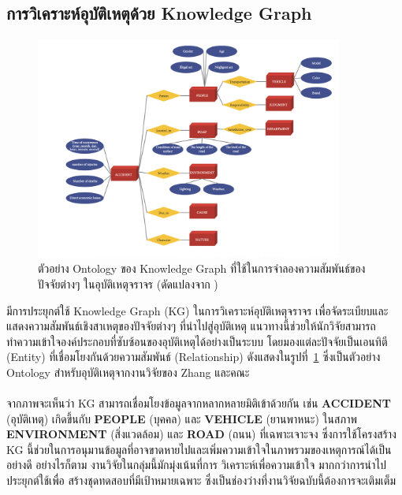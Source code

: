 \subsection{การวิเคราะห์อุบัติเหตุด้วย Knowledge Graph}{\label{sec:related_kg_analysis}}
\paragraph{}

\begin{figure}[htbp]
    \centering
    \includegraphics[width=0.9\textwidth]{images/kg-analysis-example}
    \caption{ตัวอย่าง Ontology ของ Knowledge Graph ที่ใช้ในการจำลองความสัมพันธ์ของปัจจัยต่างๆ ในอุบัติเหตุจราจร (ดัดแปลงจาก \cite{liyan2022analysis})}
    \label{fig:kg_analysis_example}
\end{figure}

มีการประยุกต์ใช้ Knowledge Graph (KG) ในการวิเคราะห์อุบัติเหตุจราจร เพื่อจัดระเบียบและแสดงความสัมพันธ์เชิงสาเหตุของปัจจัยต่างๆ ที่นำไปสู่อุบัติเหตุ แนวทางนี้ช่วยให้นักวิจัยสามารถทำความเข้าใจองค์ประกอบที่ซับซ้อนของอุบัติเหตุได้อย่างเป็นระบบ โดยมองแต่ละปัจจัยเป็นเอนทิตี (Entity) ที่เชื่อมโยงกันด้วยความสัมพันธ์ (Relationship) ดังแสดงในรูปที่~\ref{fig:kg_analysis_example} ซึ่งเป็นตัวอย่าง Ontology สำหรับอุบัติเหตุจากงานวิจัยของ Zhang และคณะ~\cite{liyan2022analysis}


\paragraph{}
จากภาพจะเห็นว่า KG สามารถเชื่อมโยงข้อมูลจากหลากหลายมิติเข้าด้วยกัน เช่น \textbf{ACCIDENT} (อุบัติเหตุ) เกิดขึ้นกับ \textbf{PEOPLE} (บุคคล) และ \textbf{VEHICLE} (ยานพาหนะ) ในสภาพ \textbf{ENVIRONMENT} (สิ่งแวดล้อม) และ \textbf{ROAD} (ถนน) ที่เฉพาะเจาะจง ซึ่งการใช้โครงสร้าง KG นี้ช่วยในการอนุมานข้อมูลที่อาจขาดหายไปและเพิ่มความเข้าใจในภาพรวมของเหตุการณ์ได้เป็นอย่างดี อย่างไรก็ตาม งานวิจัยในกลุ่มนี้มักมุ่งเน้นที่การ วิเคราะห์เพื่อความเข้าใจ มากกว่าการนำไปประยุกต์ใช้เพื่อ สร้างชุดทดสอบที่มีเป้าหมายเฉพาะ ซึ่งเป็นช่องว่างที่งานวิจัยฉบับนี้ต้องการจะเติมเต็ม

